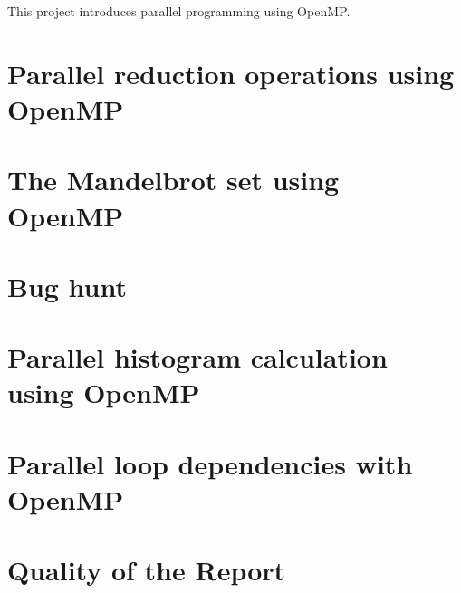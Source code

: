\documentclass[unicode,11pt,a4paper,oneside,numbers=endperiod,openany]{scrartcl}
\begin{document}
\setassignment


\assignmentpolicy
This project introduces parallel programming using OpenMP. 
\tableofcontents
\newpage
\section{Parallel reduction operations using OpenMP \texorpdfstring{}{(20 Points)}}



\section{The Mandelbrot set using OpenMP \texorpdfstring{}{(20 Points)}}
\section{Bug hunt \texorpdfstring{}{(15 Points)}}
\section{Parallel histogram calculation using OpenMP \texorpdfstring{}{(15 Points)}}
\section{Parallel loop dependencies with OpenMP \texorpdfstring{}{(15 Points)}}
\section{Quality of the Report \texorpdfstring{}{(15 Points)}}

\newpage


\end{document}
